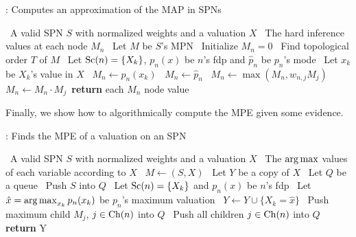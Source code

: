 \begin{algorithm}[H]
  \caption{: Computes an approximation of the MAP in SPNs}
  \begin{algorithmic}[1]
    \Require\, A valid SPN $S$ with normalized weights and a valuation $X$
    \Ensure\, The hard inference values at each node $M_n$
    \State\, Let $M$ be $S$'s MPN
    \State\, Initialize $M_n=0$
    \State\, Find topological order $T$ of $M$
        \State\, Let $\operatorname*{\text{Sc}}(n)=\{X_k\}$, $p_n(x)$ be $n$'s fdp and $\hat{p}_n$ be $p_n$'s mode
          \State\, Let $x_k$ be $X_k$'s value in $X$
          \State\, $M_n\gets p_n(x_k)$
        \Else%
          \State\, $M_n\gets\hat{p}_n$
        \EndIf%
          \State\, $M_n\gets\max(M_n, w_{n,j}M_j)$
        \EndFor%
      \Else%
          \State\, $M_n\gets M_n\cdot M_j$
        \EndFor%
      \EndIf
    \EndFor%
    \State\,\textbf{return} each $M_n$ node value
  \end{algorithmic}
\end{algorithm}

Finally, we show how to algorithmically compute the MPE given some evidence.

\begin{algorithm}[H]
  \caption{: Finds the MPE of a valuation on an SPN}
  \begin{algorithmic}[1]
    \Require\, A valid SPN $S$ with normalized weights and a valuation $X$
    \Ensure\, The $\operatorname*{arg\,max}$ values of each variable according to $X$
    \State\, $M\gets$$(S, X)$
    \State\, Let $Y$ be a copy of $X$
    \State\, Let $Q$ be a queue
    \State\, Push $S$ into $Q$
        \State\, Let $\operatorname*{\text{Sc}}(n)=\{X_k\}$ and $p_n(x)$ be $n$'s fdp
        \State\, Let $\hat{x}=\operatorname*{arg\,max}_{x_k} p_n(x_k)$ be $p_n$'s maximum valuation
          \State\, $Y\gets Y\cup\{X_k=\hat{x}\}$
        \EndIf%
        \State\, Push maximum child $M_j$, $j\in\operatorname*{\text{Ch}}(n)$ into $Q$
      \Else%
        \State\, Push all children $j\in\operatorname*{\text{Ch}}(n)$ into $Q$
      \EndIf
    \EndFor%
    \State\,\textbf{return} Y
  \end{algorithmic}
\end{algorithm}
